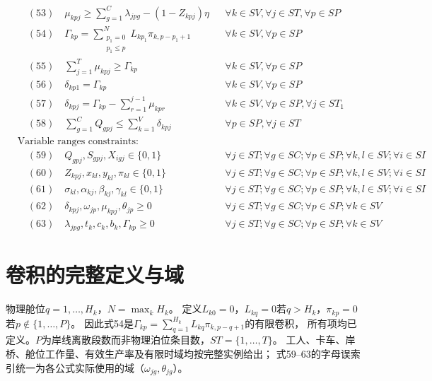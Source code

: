\documentclass[11pt]{ctexart}
\begin{document}
\begin{align*}
& \quad (53) \quad \mu_{kpj} \ge \sum_{g=1}^{C} \lambda_{jpg} - (1 - Z_{kpj}) \eta && \forall k \in SV, \forall j \in ST, \forall p \in SP \\
& \quad (54) \quad \Gamma_{kp} = \sum_{\substack{p_1=0 \\ p_1 \le p}}^{N} L_{kp_1} \pi_{k, p-p_1+1} && \forall k \in SV, \forall p \in SP \\
& \quad (55) \quad \sum_{j=1}^{T} \mu_{kpj} \ge \Gamma_{kp} && \forall k \in SV, \forall p \in SP \\
& \quad (56) \quad \delta_{kp1} = \Gamma_{kp} && \forall k \in SV, \forall p \in SP \\
& \quad (57) \quad \delta_{kpj} = \Gamma_{kp} - \sum_{r=1}^{j-1} \mu_{kpr} && \forall k \in SV, \forall p \in SP, \forall j \in ST_1 \\
& \quad (58) \quad \sum_{g=1}^{C} Q_{gpj} \le \sum_{k=1}^{V} \delta_{kpj} && \forall p \in SP, \forall j \in ST \\
& \text{Variable ranges constraints:} \\
& \quad (59) \quad Q_{gpj}, S_{gpj}, X_{igj} \in \{0, 1\} && \forall j \in ST; \forall g \in SC; \forall p \in SP; \forall k, l \in SV; \forall i \in SI \\
& \quad (60) \quad Z_{kpj}, x_{kl}, y_{kl}, \pi_{kl} \in \{0, 1\} && \forall j \in ST; \forall g \in SC; \forall p \in SP; \forall k, l \in SV; \forall i \in SI \\
& \quad (61) \quad \sigma_{kl}, \alpha_{kj}, \beta_{kj}, \gamma_{kl} \in \{0, 1\} && \forall j \in ST; \forall g \in SC; \forall p \in SP; \forall k, l \in SV; \forall i \in SI \\
& \quad (62) \quad \delta_{kpj}, \omega_{jp}, \mu_{kpj}, \theta_{jp} \ge 0 && \forall j \in ST; \forall g \in SC; \forall p \in SP; \forall k \in SV \\
& \quad (63) \quad \lambda_{jpg}, t_k, c_k, b_k, \Gamma_{kp} \ge 0 && \forall j \in ST; \forall g \in SC; \forall p \in SP; \forall k \in SV
\end{align*}


\section*{卷积的完整定义与域}
物理舱位$q=1,\ldots,H_k$，$N=\max_kH_k$。
定义$L_{k0}=0$，$L_{kq}=0$若$q>H_k$，$\pi_{kp}=0$若$p\notin\{1,\ldots,P\}$。
因此式54是$\Gamma_{kp}=\sum_{q=1}^{H_k}L_{kq}\pi_{k,p-q+1}$的有限卷积，
所有项均已定义。$P$为岸线离散段数而非物理泊位条目数，$ST=\{1,\ldots,T\}$。
工人、卡车、岸桥、舱位工作量、有效生产率及有限时域均按完整实例给出；
式59--63的字母误索引统一为各公式实际使用的域（$\omega_{jg},\theta_{jg}$）。
\end{document}
